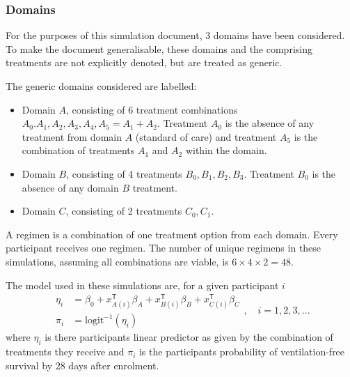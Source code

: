 \documentclass[
]{article}
\providecommand{\tightlist}{%
  \setlength{\itemsep}{0pt}\setlength{\parskip}{0pt}}
\begin{document}
\hypertarget{domains}{%
\subsubsection{Domains}\label{domains}}

For the purposes of this simulation document, 3 domains have been considered.
To make the document generalisable, these domains and the comprising treatments are not explicitly denoted, but are treated as generic.

The generic domains considered are labelled:

\begin{itemize}
\tightlist
\item
  Domain \(A\), consisting of 6 treatment combinations \(A_0.A_1,A_2,A_3,A_4,A_5 = A_1+A_2\). Treatment \(A_0\) is the absence of any treatment from domain \(A\) (standard of care) and treatment \(A_5\) is the combination of treatments \(A_1\) and \(A_2\) within the domain.
\item
  Domain \(B\), consisting of 4 treatments \(B_0,B_1,B_2,B_3\). Treatment \(B_0\) is the absence of any domain \(B\) treatment.
\item
  Domain \(C\), consisting of 2 treatments \(C_0,C_1\).
\end{itemize}

A regimen is a combination of one treatment option from each domain.
Every participant receives one regimen.
The number of unique regimens in these simulations, assuming all combinations are viable, is \(6\times 4\times 2=48\).

The model used in these simulations are, for a given participant \(i\)
\[
\begin{aligned}
\eta_i &= \beta_0 + x_{A(i)}^{\mathsf{T}}\beta_A + x_{B(i)}^{\mathsf{T}}\beta_B + x_{C(i)}^{\mathsf{T}}\beta_C \\
\pi_i &= \text{logit}^{-1}(\eta_i)
\end{aligned}, \quad i=1,2,3,...
\]
where \(\eta_i\) is there participants linear predictor as given by the combination of treatments they receive and \(\pi_i\) is the participants probability of ventilation-free survival by 28 days after enrolment.
\end{document}
